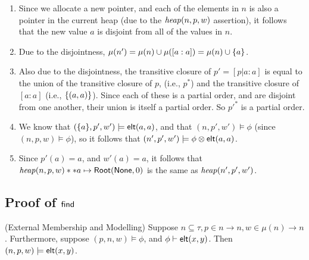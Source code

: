 \begin{enumerate}
\item Since we allocate a new pointer, and each of the elements in $n$ is also a pointer in the current heap (due to the $\mathit{heap}(n,p,w)$ assertion), it follows that the new value $a$ is disjoint from all of the values in $n$. 

\item Due to the disjointness, $\mu(n') = \mu(n) \cup \mu([a:a]) = \mu(n) \cup \{{a}\}$.

\item Also due to the disjointness, the transitive closure of $p' = [p|a:a]$ is equal to the union of the transitive closure of $p$, (i.e., $p^{*}$) and the transitive closure of $[a:a]$ (i.e., $\{{(a,a)}\}$). Since each of these is a partial order, and are disjoint from one another, their union is itself a partial order. So $p'^{*}$ is a partial order. 

\item We know that $(\{{a}\}, p', w') \models \mathsf{elt}({a}, {a})$, and that 
$(n, p', w') \models \phi$ (since $(n, p, w) \models \phi$), so it follows
that $(n', p', w') \models \phi \otimes \mathsf{elt}({a}, {a})$. 

\item Since $p'(a) = a$, and $w'(a) = a$, it follows that $\mathit{heap}(n, p, w) * 
* a \mapsto \mathsf{Root}(\mathsf{None}, 0)$ is the same as $\mathit{heap}(n', p', w')$. 
\end{enumerate}

\subsection{Proof of $\mathsf{find}$}

\begin{lemma}{(External Membership and Modelling)}
Suppose $n \subseteq \tau, p \in n \to n, w \in \mu(n) \to n$. Furthermore,
suppose $(p, n, w) \models \phi$, and ${\phi} \vdash \mathsf{elt}({x}, {y})$. 
Then $(n, p, w) \models \mathsf{elt}({x}, {y})$. 
\end{lemma}

